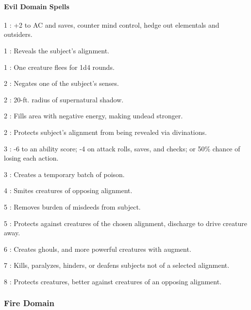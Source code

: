 \paragraph{Evil Domain Spells}
\begin{list}{}{\leftmargin=1em}
\item[1] : +2 to AC and saves, counter mind control, hedge out elementals and outsiders.
\item[1] : Reveals the subject's alignment.
\item[1] : One creature flees for 1d4 rounds.
\item[2] : Negates one of the subject's senses.
\item[2] : 20-ft. radius of supernatural shadow.
\item[2] : Fills area with negative energy, making undead stronger.
\item[2] : Protects subject's alignment from being revealed via divinations.
\item[3] : -6 to an ability score; -4 on attack rolls, saves, and checks; or 50\% chance of losing each action.
\item[3] : Creates a temporary batch of poison.
\item[4] : Smites creatures of opposing alignment.
\item[5] : Removes burden of misdeeds from subject.
\item[5] : Protects against creatures of the chosen alignment, discharge to drive creature away.
\item[6] : Creates ghouls, and more powerful creatures with augment.
\item[7] : Kills, paralyzes, hinders, or deafens subjects not of a selected alignment.
\item[8] : Protects creatures, better against creatures of an opposing alignment.
\end{list}
\subsubsection{Fire Domain}
